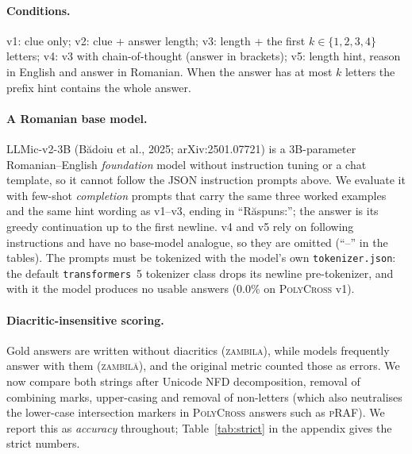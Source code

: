 \documentclass{article}
\newif\ifllmic\llmictrue
\newcommand{\poly}{\textsc{PolyCross}}
\newcommand{\them}{\textsc{ThemCross}}
\newcommand{\tabsize}{\small\setlength{\tabcolsep}{3.2pt}}
\begin{document}
\paragraph{Conditions.} v1: clue only; v2: clue + answer length; v3: length + the first $k\in\{1,2,3,4\}$
letters; v4: v3 with chain-of-thought (answer in brackets); v5: length hint, reason in English and
answer in Romanian. When the answer has at most $k$ letters the prefix hint contains the whole answer.

\ifllmic
\paragraph{A Romanian base model.} LLMic-v2-3B (B\u{a}doiu et al., 2025; arXiv:2501.07721) is a 3B-parameter
Romanian--English \emph{foundation} model without instruction tuning or a chat template, so it cannot
follow the JSON instruction prompts above. We evaluate it with few-shot \emph{completion} prompts that
carry the same three worked examples and the same hint wording as v1--v3, ending in
``R\u{a}spuns:''; the answer is its greedy continuation up to the first newline. v4 and v5 rely on
following instructions and have no base-model analogue, so they are omitted (``--'' in the tables).
The prompts must be tokenized with the model's own \texttt{tokenizer.json}: the default
\texttt{transformers}~5 tokenizer class drops its newline pre-tokenizer, and with it the model
produces no usable answers (0.0\% on \poly{} v1).
\fi

\paragraph{Diacritic-insensitive scoring.} Gold answers are written without diacritics
(\textsc{zambila}), while models frequently answer with them (\textsc{zambilă}), and the original
metric counted those as errors. We now compare both strings after Unicode NFD decomposition, removal
of combining marks, upper-casing and removal of non-letters (which also neutralises the lower-case
intersection markers in \poly{} answers such as \textsc{pRAF}). We report this as \emph{accuracy}
throughout; Table~\ref{tab:strict} in the appendix gives the strict numbers.

\begin{table}[!htb]
\centering\tabsize
\caption{Accuracy (\%, diacritic-insensitive) on the common item sets. Best per column in bold.
Len = length hint; Tr.\ = translate (v5). 95\% bootstrap intervals are at most $\pm1.8$ points on
\poly{} and $\pm3.0$ on \them{}.}
\label{tab:accuracy}

\end{table}
\end{document}
